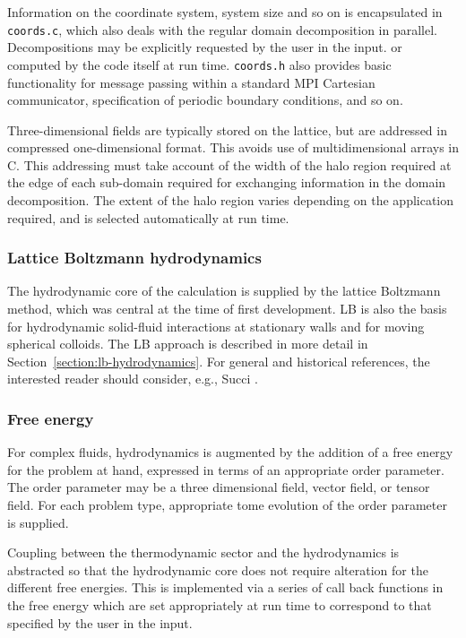 Information on the coordinate system, system size and so on is
encapsulated in \texttt{coords.c}, which also deals with the
regular domain decomposition in parallel. Decompositions may be
explicitly requested by the user in the input. or computed by
the code itself at run time. \texttt{coords.h} also provides
basic functionality for message passing within a standard MPI
Cartesian communicator, specification of periodic boundary
conditions, and so on.

Three-dimensional fields are typically stored on the lattice,
but are addressed in compressed one-dimensional format. This
avoids use of multidimensional arrays in C. This addressing
must take account of the width of the halo region required at
the edge of each sub-domain required for exchanging information
in the domain decomposition. The extent of the halo region
varies depending on the application required, and is selected
automatically at run time.

\subsubsection{Lattice Boltzmann hydrodynamics}

The hydrodynamic core of the calculation is supplied by the lattice
Boltzmann method, which was central at the time of first development.
LB is also the basis for hydrodynamic solid-fluid interactions at
stationary walls and for moving spherical colloids. The LB approach
is described in more detail in Section~\ref{section:lb-hydrodynamics}.
For general
and historical references, the interested reader should consider,
e.g., Succi \cite{succi}.

\subsubsection{Free energy}

For complex fluids, hydrodynamics is augmented by the addition of
a free energy for the problem at hand, expressed in terms of an
appropriate order parameter. The order parameter may be a three
dimensional field, vector field, or tensor field. For each problem
type, appropriate tome evolution of the order parameter is supplied.

Coupling between the thermodynamic sector and the hydrodynamics is
abstracted so that the hydrodynamic core does not require alteration
for the different free energies. This is implemented via a series of
call back functions in the free energy which are set appropriately
at run time to correspond to that specified by the user in the
input.

